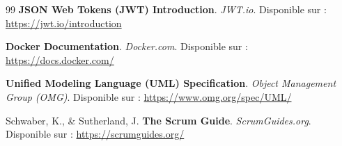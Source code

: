 \documentclass[12pt, a4paper]{report}
\begin{document}
\begin{thebibliography}{99}
\textbf{JSON Web Tokens (JWT) Introduction}. 
\textit{JWT.io}. Disponible sur : \url{https://jwt.io/introduction}

\textbf{Docker Documentation}. 
\textit{Docker.com}. Disponible sur : \url{https://docs.docker.com/}

\textbf{Unified Modeling Language (UML) Specification}. 
\textit{Object Management Group (OMG)}. Disponible sur : \url{https://www.omg.org/spec/UML/}

Schwaber, K., \& Sutherland, J. \textbf{The Scrum Guide}. 
\textit{ScrumGuides.org}. Disponible sur : \url{https://scrumguides.org/}

\end{thebibliography}
\end{document}
